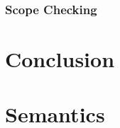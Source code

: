 \subsection{Scope Checking}

\renewcommand{\ind}[1]{}
\chapter{Conclusion}



\begingroup
	\raggedright
	{}	%
\endgroup


\newpage
\listoffixmes	%

\clearforchapter
\appendix	%


\renewcommand{\ind}[1]{}
\chapter{Semantics}
\ind{TransitionRules}
\ind{fullcodeapp}
